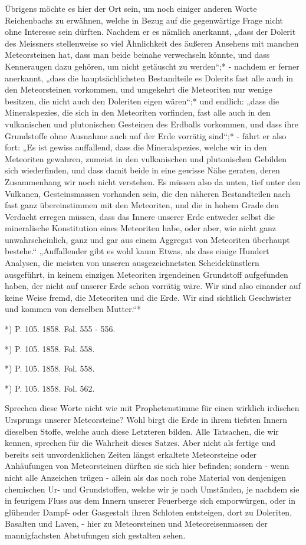 \documentclass[a4paper, 11pt, oneside, polutonikogreek, german]{article}
\begin{document}
Übrigens möchte es hier der Ort sein, um noch einiger anderen Worte Reichenbachs zu erwähnen, welche in Bezug auf die gegenwärtige Frage nicht ohne Interesse sein dürften. Nachdem er es nämlich anerkannt, „dass der Dolerit des Meissners stellenweise so viel Ähnlichkeit des äußeren Ansehens mit manchen Meteorsteinen hat, dass man beide beinahe verwechseln könnte, und dass Kenneraugen dazu gehören, um nicht getäuscht zu werden“;* - nachdem er ferner anerkannt, „dass die hauptsächlichsten Bestandteile es Dolerits fast alle auch in den Meteorsteinen vorkommen, und umgekehrt die Meteoriten nur wenige besitzen, die nicht auch den Doleriten eigen wären“;* und endlich: „dass die Mineralspezies, die sich in den Meteoriten vorfinden, fast alle auch in den vulkanischen und plutonischen Gesteinen des Erdballs vorkommen, und dass ihre Grundstoffe ohne Ausnahme auch auf der Erde vorrätig sind“;* - fährt er also fort: „Es ist gewiss auffallend, dass die Mineralspezies, welche wir in den Meteoriten gewahren, zumeist in den vulkanischen und plutonischen Gebilden sich wiederfinden, und dass damit beide in eine gewisse Nähe geraten, deren Zusammenhang wir noch nicht verstehen. Es müssen also da unten, tief unter den Vulkanen, Gesteinsmassen vorhanden sein, die den näheren Bestandteilen nach fast ganz übereinstimmen mit den Meteoriten, und die in hohem Grade den Verdacht erregen müssen, dass das Innere unserer Erde entweder selbst die mineralische Konstitution eines Meteoriten habe, oder aber, wie nicht ganz unwahrscheinlich, ganz und gar aus einem Aggregat von Meteoriten überhaupt bestehe.“ „Auffallender gibt es wohl kaum Etwas, als dass einige Hundert Analysen, die meisten von unseren ausgezeichnetsten Scheidekünstlern ausgeführt, in keinem einzigen Meteoriten irgendeinen Grundstoff aufgefunden haben, der nicht auf unserer Erde schon vorrätig wäre. Wir sind also einander auf keine Weise fremd, die Meteoriten und die Erde. Wir sind sichtlich Geschwister und kommen von derselben Mutter.“*

*) P. 105. 1858. Fol. 555 - 556.

*) P. 105. 1858. Fol. 558.

*) P. 105. 1858. Fol. 558.

*) P. 105. 1858. Fol. 562.

Sprechen diese Worte nicht wie mit Prophetenstimme für einen wirklich irdischen Ursprungs unserer Meteorsteine? Wohl birgt die Erde in ihrem tiefsten Innern dieselben Stoffe, welche auch diese Letzteren bilden. Alle Tatsachen, die wir kennen, sprechen für die Wahrheit dieses Satzes. Aber nicht als fertige und bereits seit unvordenklichen Zeiten längst erkaltete Meteorsteine oder Anhäufungen von Meteorsteinen dürften sie sich hier befinden; sondern - wenn nicht alle Anzeichen trügen - allein als das noch rohe Material von denjenigen chemischen Ur- und Grundstoffen, welche wir je nach Umständen, je nachdem sie in feurigem Fluss aus dem Innern unserer Feuerberge sich emporwürgen, oder in glühender Dampf- oder Gasgestalt ihren Schloten entsteigen, dort zu Doleriten, Basalten und Laven, - hier zu Meteorsteinen und Meteoreisenmassen der mannigfachsten Abstufungen sich gestalten sehen.
\end{document}
